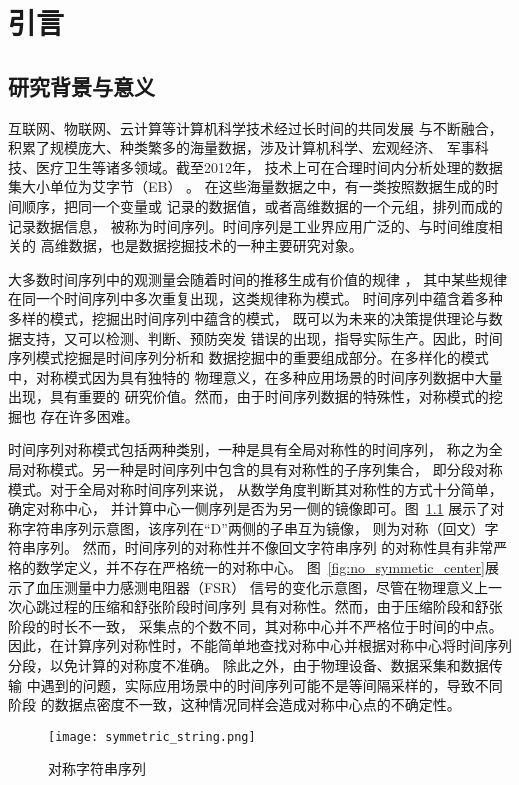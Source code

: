 
\chapter{引言}

\section{研究背景与意义}
互联网、物联网、云计算等计算机科学技术经过长时间的共同发展
与不断融合，积累了规模庞大、种类繁多的海量数据，涉及计算机科学、宏观经济、
军事科技、医疗卫生等诸多领域\cite{2022968}。截至2012年，
技术上可在合理时间内分析处理的数据集大小单位为艾字节（EB）
\cite{DBLP:journals/jbd/TsaiLCV15}。
在这些海量数据之中，有一类按照数据生成的时间顺序，把同一个变量或
记录的数据值，或者高维数据的一个元组，排列而成的记录数据信息，
被称为时间序列。时间序列是工业界应用广泛的、与时间维度相关的
高维数据，也是数据挖掘技术的一种主要研究对象。

大多数时间序列中的观测量会随着时间的推移生成有价值的规律
\cite{DBLP:conf/sdm/MueenKZCW09}，
其中某些规律在同一个时间序列中多次重复出现，这类规律称为模式。
时间序列中蕴含着多种多样的模式，挖掘出时间序列中蕴含的模式，
既可以为未来的决策提供理论与数据支持，又可以检测、判断、预防突发
错误的出现，指导实际生产。因此，时间序列模式挖掘是时间序列分析和
数据挖掘中的重要组成部分。在多样化的模式中，对称模式因为具有独特的
物理意义，在多种应用场景的时间序列数据中大量出现，具有重要的
研究价值\cite{2022968}。然而，由于时间序列数据的特殊性，对称模式的挖掘也
存在许多困难。

时间序列对称模式包括两种类别，一种是具有全局对称性的时间序列，
称之为全局对称模式。另一种是时间序列中包含的具有对称性的子序列集合，
即分段对称模式。对于全局对称时间序列来说，
从数学角度判断其对称性的方式十分简单，确定对称中心，
并计算中心一侧序列是否为另一侧的镜像即可。图~\ref{fig:symmetric_string}
展示了对称字符串序列示意图，该序列在“D”两侧的子串互为镜像，
则为对称（回文）字符串序列\cite{DBLP:journals/corr/abs-2003-08211}。
然而，时间序列的对称性并不像回文字符串序列
的对称性具有非常严格的数学定义，并不存在严格统一的对称中心。
图~\ref{fig:no_symmetic_center}展示了血压测量中力感测电阻器（FSR）
信号的变化示意图，尽管在物理意义上一次心跳过程的压缩和舒张阶段时间序列
具有对称性。然而，由于压缩阶段和舒张阶段的时长不一致，
采集点的个数不同，其对称中心并不严格位于时间的中点。
因此，在计算序列对称性时，不能简单地查找对称中心并根据对称中心将时间序列
分段，以免计算的对称度不准确\cite{DBLP:journals/csda/DaiNG18}。
除此之外，由于物理设备、数据采集和数据传输
中遇到的问题，实际应用场景中的时间序列可能不是等间隔采样的，导致不同阶段
的数据点密度不一致，这种情况同样会造成对称中心点的不确定性。
\begin{figure}[t]
  \centering
  \texttt{[image: symmetric\_string.png]}
  \caption{对称字符串序列}
  \label{fig:symmetric_string}
\end{figure}

